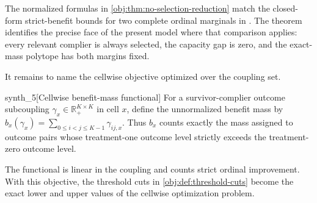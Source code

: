 \documentclass[11pt]{article}
\begin{document}
The normalized formulas in \cref{obj:thm:no-selection-reduction} match the closed-form strict-benefit bounds for two complete ordinal marginals in \citet[Proposition 2, equation (6), p.~546]{LuDingDasgupta2018}. The theorem identifies the precise face of the present model where that comparison applies: every relevant complier is always selected, the capacity gap is zero, and the exact-mass polytope has both margins fixed.

It remains to name the cellwise objective optimized over the coupling set.

\begin{definitionv}{synth_5}[Cellwise benefit-mass functional]
For a survivor-complier outcome subcoupling $\gamma_x\in\mathbb R_+^{K\times K}$ in cell $x$, define the unnormalized benefit mass by $b_x(\gamma_x)=\sum_{0\le i<j\le K-1}\gamma_{ij,x}$. Thus $b_x$ counts exactly the mass assigned to outcome pairs whose treatment-one outcome level strictly exceeds the treatment-zero outcome level.
\end{definitionv}

The functional  is linear in the coupling and counts strict ordinal improvement. With this objective, the threshold cuts in \cref{obj:def:threshold-cuts} become the exact lower and upper values of the cellwise optimization problem.
\end{document}
